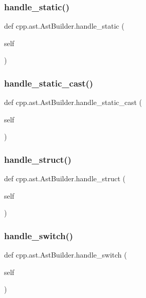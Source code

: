\subsubsection{\texorpdfstring{handle\_static()}{handle\_static()}}
{\footnotesize\ttfamily def cpp.\+ast.\+Ast\+Builder.\+handle\+\_\+static (\begin{DoxyParamCaption}\item[{}]{self }\end{DoxyParamCaption})}

\mbox{\label{classcpp_1_1ast_1_1_ast_builder_ab7577b3a2bd22c1bccb656493de379f3}} 
\subsubsection{\texorpdfstring{handle\_static\_cast()}{handle\_static\_cast()}}
{\footnotesize\ttfamily def cpp.\+ast.\+Ast\+Builder.\+handle\+\_\+static\+\_\+cast (\begin{DoxyParamCaption}\item[{}]{self }\end{DoxyParamCaption})}

\mbox{\label{classcpp_1_1ast_1_1_ast_builder_aadfad5b8d50962c04504e806dc0f5b6c}} 
\subsubsection{\texorpdfstring{handle\_struct()}{handle\_struct()}}
{\footnotesize\ttfamily def cpp.\+ast.\+Ast\+Builder.\+handle\+\_\+struct (\begin{DoxyParamCaption}\item[{}]{self }\end{DoxyParamCaption})}

\mbox{\label{classcpp_1_1ast_1_1_ast_builder_a1dffcdf7154158461a652c5b885bfa19}} 
\subsubsection{\texorpdfstring{handle\_switch()}{handle\_switch()}}
{\footnotesize\ttfamily def cpp.\+ast.\+Ast\+Builder.\+handle\+\_\+switch (\begin{DoxyParamCaption}\item[{}]{self }\end{DoxyParamCaption})}

